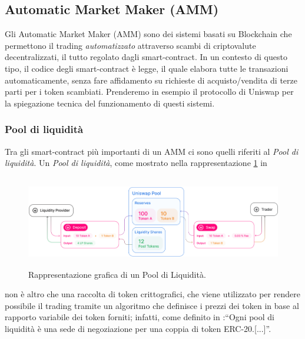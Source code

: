 \subsection{Automatic Market Maker (AMM)}\label{AMM}
Gli Automatic Market Maker (AMM) sono dei sistemi basati su Blockchain che permettono il trading \textit{automatizzato} attraverso scambi di criptovalute decentralizzati, il tutto regolato dagli smart-contract. In un contesto di questo tipo, il codice degli smart-contract è legge, il quale elabora tutte le transazioni automaticamente, senza fare affidamento su richieste di acquisto/vendita di terze parti per i token scambiati. Prenderemo in esempio il protocollo di Uniswap \cite{uniswap_docs} per la spiegazione tecnica del funzionamento di questi sistemi. 

\subsubsection{Pool di liquidità}\makeatletter{}\makeatother\label{pool_liquidità}
Tra gli smart-contract più importanti di un AMM ci sono quelli riferiti al \textit{Pool di liquidità}.
Un\textit{ Pool di liquidità}, come mostrato nella rappresentazione \ref{pool} in \cite{uniswap_pool}

\begin{figure}[h]
    \centering
    \includegraphics[width=13cm,height=4cm]{Immagini/Pool.png}
    \caption[Rappresentazione grafica di un Pool di Liquidità]{Rappresentazione grafica di un Pool di Liquidità.}
    \label{pool}
\end{figure}


non è altro che una raccolta di token crittografici, che viene utilizzato per rendere possibile il trading tramite un algoritmo che definisce i prezzi dei token in base al rapporto variabile dei token forniti; infatti, come definito in \cite{uniswap_pool}:“Ogni pool di liquidità è una sede di negoziazione per una coppia di token ERC-20.[...]”.

